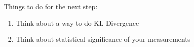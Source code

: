 \documentclass{article}
\begin{document}
\fontsize{11pt}{10pt}\selectfont

\setlength{\parindent}{0pt}
Things to do for the next step:
\begin{enumerate}
    \item Think about a way to do KL-Divergence
    \item Think about statistical significance of your measurements
\end{enumerate}
\end{document}
